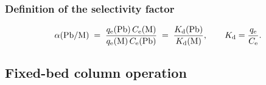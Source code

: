 \begin{table}[htbp]
  \centering
  \caption[Ternary composition in mass and molar units]{Composition of the two ternary systems in \unit{\milli\gram\per\litre} and \unit{\milli\mole\per\litre}, showing the molar ratio of each competitor to \PbII{}. Both compositions place \PbII{} at a molar deficit; the minority-target system, used as the headline competitive condition, places it at an approximately thirteen-fold per-metal molar disadvantage. Initial concentrations are the \emph{measured} values of the pre-contact aliquots, not the nominal values.}
  \label{tab:ternary-composition}
\end{table}

\subsubsection{Definition of the selectivity factor}
\label{sec:selectivity-def}
\begin{equation}
  \alpha(\mathrm{Pb}/\mathrm{M}) \;=\;
  \frac{q_{\mathrm{e}}(\mathrm{Pb})\,C_{\mathrm{e}}(\mathrm{M})}{q_{\mathrm{e}}(\mathrm{M})\,C_{\mathrm{e}}(\mathrm{Pb})}
  \;=\; \frac{K_{\mathrm{d}}(\mathrm{Pb})}{K_{\mathrm{d}}(\mathrm{M})},
  \qquad K_{\mathrm{d}} = \frac{q_{\mathrm{e}}}{C_{\mathrm{e}}}.
  \label{eq:alpha}
\end{equation}

\subsection{Fixed-bed column operation}
\label{sec:column-method}
%

